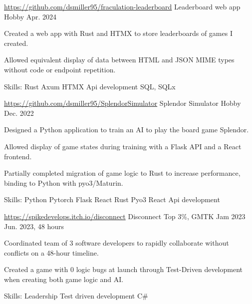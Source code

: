 \begin{cventries}
 \cventry
  {\href{https://github.com/dsmiller95/fraculation-leaderboard}{https://github.com/dsmiller95/fraculation-leaderboard}} %
   {Leaderboard web app} %
   {Hobby} %
   {Apr. 2024} %
   {
     \begin{cvitems} %
      \item {Created a web app with Rust and HTMX to store leaderboards of games I created.}
      \item {Allowed equivalent display of data between HTML and JSON MIME types without code or endpoint repetition.}
      \item {Skills: Rust \textbullet{} Axum \textbullet{} HTMX \textbullet{} Api development \textbullet{} SQL, SQLx }
     \end{cvitems}
   }

 \cventry
  {\href{https://github.com/dsmiller95/SplendorSimulator}{https://github.com/dsmiller95/SplendorSimulator}} %
   {Splendor Simulator} %
   {Hobby} %
   {Dec. 2022} %
   {
     \begin{cvitems} %
      \item {Designed a Python application to train an AI to play the board game Splendor.}
      \item {Allowed display of game states during training with a Flask API and a React frontend.}
      \item {Partially completed migration of game logic to Rust to increase performance, binding to Python with pyo3/Maturin.}
      \item {Skills: Python \textbullet{} Pytorch \textbullet{} Flask \textbullet{} React \textbullet{} Rust \textbullet{} Pyo3 \textbullet{} React \textbullet{} Api development }
     \end{cvitems}
   }

  \cventry
   {\href{https://spikedevelops.itch.io/disconnect}{https://spikedevelops.itch.io/disconnect}} %
    {Disconnect} %
    {Top 3\%, GMTK Jam 2023} %
    {Jun. 2023, 48 hours} %
    {
      \begin{cvitems} %
        \item {Coordinated team of 3 software developers to rapidly collaborate without conflicts on a 48-hour timeline.}
        \item {Created a game with 0 logic bugs at launch through Test-Driven development when creating both game logic and AI.}
        \item {Skills: Leadership \textbullet{} Test driven development \textbullet{} C\#}
      \end{cvitems}
 }


\end{cventries}
